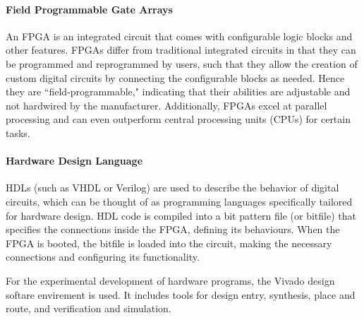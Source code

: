 \paragraph{Field Programmable Gate Arrays}
An FPGA is an integrated circuit that comes with configurable logic blocks and other features. FPGAs differ from traditional integrated circuits in that they can be programmed and reprogrammed by users, such that they allow the creation of custom digital circuits by connecting the configurable blocks as needed. Hence they are ``field-programmable," indicating that their abilities are adjustable and not hardwired by the manufacturer. Additionally, FPGAs excel at parallel processing and can even outperform central processing units (CPUs) for certain tasks.

\paragraph{Hardware Design Language}

HDLs (such as VHDL or Verilog) are used to describe the behavior of digital circuits, which can be thought of as programming languages specifically tailored for hardware design. HDL code is compiled into a bit pattern file (or bitfile) that specifies the connections inside the FPGA, defining its behaviours. When the FPGA is booted, the bitfile is loaded into the circuit, making the necessary connections and configuring its functionality.

For the experimental development of hardware programs, the Vivado design softare envirement is used. It includes tools for design entry, synthesis, place and route, and verification and simulation.